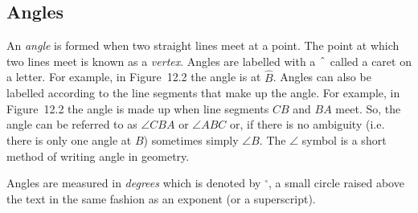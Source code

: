             \subsection{ Angles}
            \nopagebreak
      \label{m39370*id314141}An \textsl{angle} is formed when two straight lines meet at a point. The point at which two lines meet is known as a \textsl{vertex}. Angles are labelled with a \begin{math}\phantom{\rule{0.277778em}{0ex}}\hat{}\phantom{\rule{0.277778em}{0ex}}\end{math} called a caret on a letter. For example, in Figure~12.2 the angle is at \begin{math}\hat{B}\end{math}. Angles can also be labelled according to the line segments that make up the angle. For example, in Figure~12.2 the angle is made up when line segments \begin{math}CB\end{math} and \begin{math}BA\end{math} meet. So, the angle can be referred to as \begin{math}\angle CBA\end{math}\hspace{1ex} or \begin{math}\angle ABC\end{math}\hspace{1ex} or, if there is no ambiguity (i.e. there is only one angle at \begin{math}B\end{math}) sometimes simply \begin{math}\angle B\end{math}. The \begin{math}\angle \end{math} symbol is a short method of writing angle in geometry.\par 
      \label{m39370*id314241}Angles are measured in \textsl{degrees} which is denoted by \begin{math}{}^{\circ }\end{math}, a small circle raised above the text in the same fashion as an exponent (or a superscript).\par 
      \label{m39370*eip-522}\label{m39370*notfhsst!!!underscore!!!id43812}
